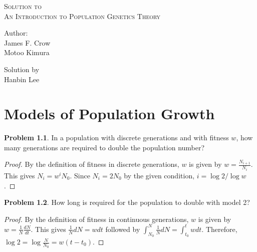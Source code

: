 \documentclass[12pt]{report}
\theoremstyle{definition}
\newtheorem{problem}{Problem}[chapter]
\begin{document}
\begin{titlepage}
\centering
{\scshape\LARGE Solution to  \\
An Introduction to Population Genetics Theory \par}
\vspace{1.5cm}
{\large Author: \\
    James F. Crow \\
    Motoo Kimura \par}
\vspace{1.5cm}
Solution by \\
Hanbin Lee

\end{titlepage}

\tableofcontents

    \chapter{Models of Population Growth}

    \begin{problem}
        In a population with discrete generations and with fitness $w$, how many generations are required to double the population number?

        \begin{proof}
            By the definition of fitness in discrete generations, $w$ is given by $w = \frac{N_{i+1}}{N_i}$.
            This gives $N_{i} = w^{i} N_0$. 
            Since $N_i = 2N_0$ by the given condition, $i = \log{2}/\log{w}$.
        \end{proof}
    \end{problem}

    \begin{problem}
        How long is required for the population to double with model 2?
        
        \begin{proof}
            By the definition of fitness in continuous generations, $w$ is given by $w = \frac{1}{N} \frac{dN}{dt}$.
            This gives $\frac{1}{N}dN = wdt$ followed by $\int_{N_0}^{N} \frac{1}{N}dN = \int_{t_0}^{t} w dt$. 
            Therefore, $\log2 = \log{\frac{N}{N_0}} = w(t - t_0)$.
        \end{proof}
    \end{problem}
\end{document}
